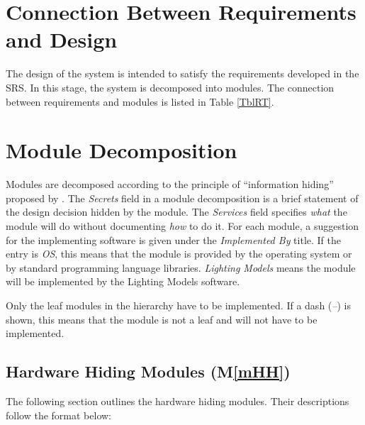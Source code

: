 \documentclass[12pt, titlepage]{article}
\newcommand{\mref}[1]{M\ref{#1}}
\begin{document}
\section{Connection Between Requirements and Design} \label{SecConnection}

The design of the system is intended to satisfy the requirements developed in
the SRS. In this stage, the system is decomposed into modules. The connection
between requirements and modules is listed in Table \ref{TblRT}.




\section{Module Decomposition} \label{SecMD}

Modules are decomposed according to the principle of ``information hiding''
proposed by \citet{ParnasEtAl1984}. The \emph{Secrets} field in a module
decomposition is a brief statement of the design decision hidden by the
module. The \emph{Services} field specifies \emph{what} the module will do
without documenting \emph{how} to do it. For each module, a suggestion for the
implementing software is given under the \emph{Implemented By} title. If the
entry is \emph{OS}, this means that the module is provided by the operating
system or by standard programming language libraries.  \emph{Lighting Models} 
means 
the
module will be implemented by the Lighting Models software.

Only the leaf modules in the hierarchy have to be implemented. If a dash
(\emph{--}) is shown, this means that the module is not a leaf and will not have
to be implemented.

\subsection{Hardware Hiding Modules (\mref{mHH})}
The following section outlines the hardware hiding modules. Their 
descriptions follow the format below: 
\end{document}
